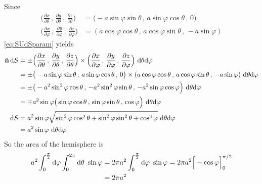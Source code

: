 \begin{eg}
\begin{equation*}
\end{equation*}
Since
\begin{align*}
\Big(\frac{\partial x}{\partial\theta}\,,\,
      \frac{\partial y}{\partial\theta}\,,\,
      \frac{\partial z}{\partial\theta}\Big)
&=\big(-a\sin\varphi\sin\theta\,,\,
       a\sin\varphi\cos\theta\,,\,0\big)\\
\Big(\frac{\partial x}{\partial\varphi}\,,\,\frac{\partial y}{\partial\varphi}
             \,,\, \frac{\partial z}{\partial\varphi}\Big)
&=(a\cos\varphi\cos\theta\,,\,a\cos\varphi\sin\theta\,,\,-a\sin\varphi) 
\end{align*}
\eqref{eq:SUdSparam} yields
\begin{align*}
\hat{\mathbf{n}}\,\mathrm{d}S
&=\pm\Big(\frac{\partial x}{\partial\theta}\,,\,
          \frac{\partial y}{\partial\theta}\,,\,
          \frac{\partial z}{\partial\theta}\Big)
\times
\Big(\frac{\partial x}{\partial\varphi}\,,\,\frac{\partial y}{\partial\varphi}
   \,,\, \frac{\partial z}{\partial\varphi}\Big)
\ \mathrm{d}\theta\mathrm{d}\varphi\\
&=\pm \big(-a\sin\varphi\sin\theta\,,\,
       a\sin\varphi\cos\theta\,,\,0\big)
\times
(a\cos\varphi\cos\theta\,,\,a\cos\varphi\sin\theta\,,\,-a\sin\varphi)
\ \mathrm{d}\theta\mathrm{d}\varphi\\
&=\pm\big(-a^2\sin^2\varphi\cos\theta\,,\,
          -a^2\sin^2\varphi\sin\theta\,,\,
          -a^2\sin\varphi\cos\varphi\Big)\ \mathrm{d}\theta\mathrm{d}\varphi \\
&=\mp a^2\sin\varphi \big(\sin\varphi\cos\theta\,,\,
          \sin\varphi\sin\theta\,,\,
          \cos\varphi\Big)\ \mathrm{d}\theta\mathrm{d}\varphi \\
\mathrm{d}S&=a^2\sin\varphi \sqrt{\sin^2\varphi\cos^2\theta
                    +\sin^2\varphi\sin^2\theta
                    +\cos^2\varphi}\ \mathrm{d}\theta\mathrm{d}\varphi\\
        &=a^2\sin\varphi\ \mathrm{d}\theta\mathrm{d}\varphi
\end{align*}
So the area of the hemisphere is
\begin{align*}
a^2\int_0^{\frac{\pi}{2}} \dee{\varphi }\int_0^{2\pi}\dee{\theta}\ \sin\varphi
&=2\pi a^2 \int_0^{\frac{\pi}{2}} \dee{\varphi }\ \sin\varphi
=2\pi a^2\Big[-\cos\varphi\Big]_0^{\pi/2} \\
&=2\pi a^2
\end{align*}
\end{eg}

